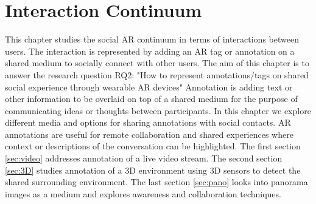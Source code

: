 \chapter{Interaction Continuum} %
\label{ch:annotation} %

This chapter studies the social AR continuum in terms of interactions between users. The interaction is represented by adding an AR tag or annotation on a shared medium to socially connect with other users. 
The aim of this chapter is to answer the research question RQ2: "How to represent annotations/tags on shared social experience through wearable AR devices"
Annotation is adding text or other information to be overlaid on top of a shared medium for the purpose of communicating ideas or thoughts between participants. In this chapter we explore different media and options for sharing annotations with social contacts. AR annotations are useful for remote collaboration and shared experiences where context or descriptions of the conversation can be highlighted.  
The first section \ref{sec:video} addresses annotation of a live video stream. The second section \ref{sec:3D} studies annotation of a 3D environment using 3D sensors to detect the shared surrounding environment. The last section \ref{sec:pano} looks into panorama images as a medium and explores awareness and collaboration techniques. 





